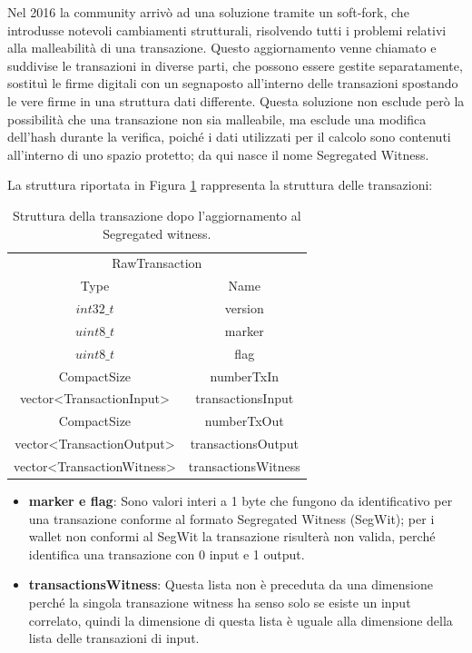 Nel 2016 la community arrivò ad una soluzione tramite un soft-fork, che introdusse notevoli cambiamenti strutturali, risolvendo tutti i problemi relativi alla malleabilità di una transazione. Questo aggiornamento venne chiamato  e suddivise le transazioni in diverse parti, che possono essere gestite separatamente, sostituì le firme digitali con un segnaposto all’interno delle transazioni spostando le vere firme in una struttura dati differente. Questa soluzione non esclude però la possibilità che una transazione non sia malleabile, ma esclude una modifica dell’hash durante la verifica, poiché i dati utilizzati per il calcolo sono contenuti all’interno di uno spazio protetto; da qui nasce il nome Segregated Witness.

La struttura riportata in Figura \ref{tab:rawtxbitcoinc} rappresenta la struttura delle transazioni:

\begin{table}
       \centering\small
           \begin{tabular}{cc}
               \toprule
                 \multicolumn{2}{c}{RawTransaction} \\
                 \cmidrule(lr){1-2}
                 \multicolumn{1}{c}{Type} & \multicolumn{1}{c}{Name} \\
               \midrule
               $int32\_t$ & version   \\
               $uint8\_t$ & marker \\
               $uint8\_t$ & flag \\
               CompactSize & numberTxIn \\
               vector<TransactionInput> & transactionsInput \\
               CompactSize & numberTxOut \\
               vector<TransactionOutput> & transactionsOutput \\
               vector<TransactionWitness> & transactionsWitness \\
               \bottomrule
       \end{tabular}
       \caption{Struttura della transazione dopo l’aggiornamento al Segregated witness.\label{tab:rawtxbitcoinc}}
   \end{table}

\begin{itemize}
  \item {\bf marker e flag\/}: Sono valori interi a 1 byte che fungono da identificativo per una transazione conforme al formato Segregated Witness (SegWit); per i wallet non conformi al SegWit la transazione risulterà non valida, perché identifica una transazione con 0 input e 1 output.
  \item {\bf transactionsWitness\/}: Questa lista non è preceduta da una dimensione perché la singola transazione witness ha senso solo se esiste un input correlato, quindi la dimensione di questa lista è uguale alla dimensione della lista delle transazioni di input.
\end{itemize}

